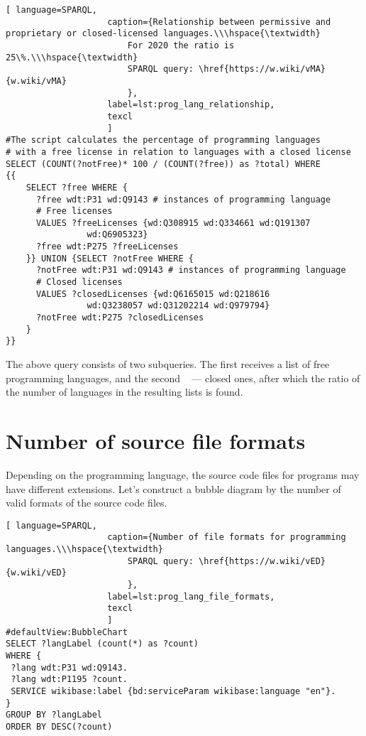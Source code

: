 \begin{lstlisting}[ language=SPARQL, 
                    caption={Relationship between permissive and proprietary or closed-licensed languages.\\\hspace{\textwidth}
                        For 2020 the ratio is 25\%.\\\hspace{\textwidth}
                        SPARQL query: \href{https://w.wiki/vMA}{w.wiki/vMA}
                        },
                    label=lst:prog_lang_relationship,
                    texcl 
                    ]
#The script calculates the percentage of programming languages
# with a free license in relation to languages with a closed license
SELECT (COUNT(?notFree)* 100 / (COUNT(?free)) as ?total) WHERE
{{
    SELECT ?free WHERE {
      ?free wdt:P31 wd:Q9143 # instances of programming language
      # Free licenses
      VALUES ?freeLicenses {wd:Q308915 wd:Q334661 wd:Q191307 
				wd:Q6905323}
      ?free wdt:P275 ?freeLicenses
    }} UNION {SELECT ?notFree WHERE {
      ?notFree wdt:P31 wd:Q9143 # instances of programming language
      # Closed licenses
      VALUES ?closedLicenses {wd:Q6165015 wd:Q218616 
				wd:Q3238057 wd:Q31202214 wd:Q979794}
      ?notFree wdt:P275 ?closedLicenses
    }
}}
\end{lstlisting}%
The above query consists of two subqueries. The first receives a list of free programming languages, and the second ~ --- closed ones, after which the ratio of the number of languages in the resulting lists is found.

\section{Number of source file formats}
Depending on the programming language, the source code files for programs may have different extensions. Let's construct a bubble diagram by the number of valid formats of the source code files.
\begin{lstlisting}[ language=SPARQL, 
                    caption={Number of file formats for programming languages.\\\hspace{\textwidth}
                        SPARQL query: \href{https://w.wiki/vED}{w.wiki/vED}
                        },
                    label=lst:prog_lang_file_formats,
                    texcl 
                    ]
#defaultView:BubbleChart
SELECT ?langLabel (count(*) as ?count)
WHERE {
 ?lang wdt:P31 wd:Q9143.
 ?lang wdt:P1195 ?count.
 SERVICE wikibase:label {bd:serviceParam wikibase:language "en"}.
}
GROUP BY ?langLabel
ORDER BY DESC(?count)
\end{lstlisting}%

